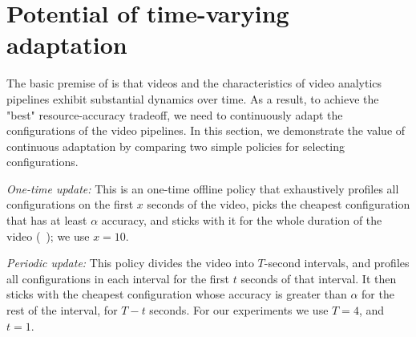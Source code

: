 \section{Potential of time-varying adaptation}
\label{sec:potential}

The basic premise of \name is that videos and the characteristics of video analytics pipelines exhibit substantial dynamics over time. As a result, to achieve the "best" resource-accuracy tradeoff, we need to continuously adapt the configurations of the video pipelines. In this section, we demonstrate the value of continuous adaptation by comparing two simple policies 
for selecting \nn configurations.

\begin{packedenumerate}
\item {\em One-time update:}
This is an one-time offline policy that exhaustively profiles all configurations on the first $x$ seconds of the 
video, picks the cheapest configuration that has at least $\alpha$ 
accuracy, and sticks with it for the whole duration of the video
(\eg~\cite{videostar}); we use $x=10$.
\item {\em Periodic update:}
This policy divides the video into $T$-second intervals, and profiles all configurations in each interval for the first $t$ seconds of that interval. It then sticks with the cheapest configuration whose accuracy is greater than $\alpha$ for the rest of the interval, \ie for $T-t$ seconds. For our experiments we use $T = 4$, and $t = 1$.
\end{packedenumerate}


